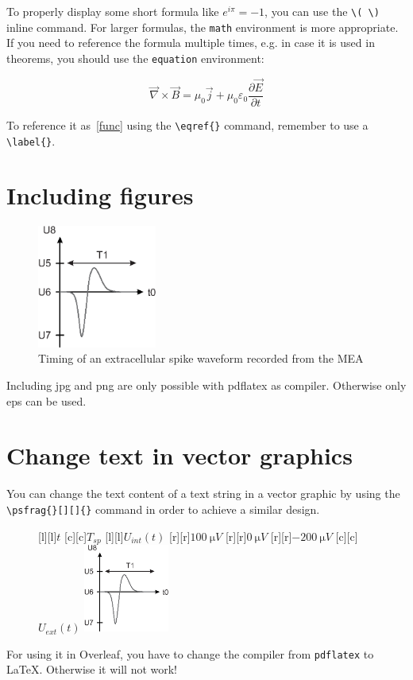 To properly display some short formula like \( e^{i \pi} = -1\),
you can use the \verb+\( \)+ inline command.
For larger formulas, the \verb+math+ environment is more appropriate.
If you need to reference the formula multiple times,
e.g. in case it is used in theorems,
you should use the \verb+equation+ environment:

\begin{equation}
	\vec\nabla\times\vec{B}= \mu_0\vec{j}+\mu_0\varepsilon_0\frac{\partial\vec{E}}{\partial t}
	\label{func}
\end{equation}

To reference it as~\eqref{func} using the \verb+\eqref{}+ command,
remember to use a \verb+\label{}+.
\section{Including figures}
\begin{figure}[ht]    \centering
    \includegraphics[width=0.35\textwidth]{figures/example.eps}
    \caption{Timing of an extracellular spike waveform recorded from the MEA}
    \label{fig:NeuronSetup0}
\end{figure}
Including jpg and png are only possible with pdflatex as compiler. Otherwise only eps can be used.

\newpage
\section{Change text in vector graphics}
You can change the text content of a text string in a vector graphic by using the \verb+\psfrag{}[][]{}+ command in order to achieve a similar design.
\begin{figure}[ht]  \centering
    [l][l]{$t$}
    [c][c]{$T_{sp}$}
    [l][l]{$U_{int}(t)$}
    [r][r]{$\SI{100}{\micro V}$}
    [r][r]{$\SI{0}{\micro V}$}
    [r][r]{$\SI{-200}{\micro V}$}
    [c][c]{$U_{ext}(t)$}
    \includegraphics[width=0.25\textwidth]{figures/example.eps}
    \label{fig:TutorialNeuron1}
\end{figure}
For using it in Overleaf, you have to change the compiler from \verb+pdflatex+ to LaTeX. Otherwise it will not work!

